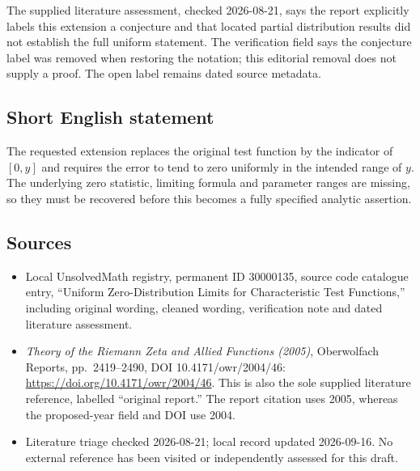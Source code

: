 \documentclass[11pt]{article}
\begin{document}
The supplied literature assessment, checked 2026-08-21, says the report explicitly labels this extension a conjecture and that located partial distribution results did not establish the full uniform statement. The verification field says the conjecture label was removed when restoring the notation; this editorial removal does not supply a proof. The open label remains dated source metadata.
\subsection{Short English statement}
The requested extension replaces the original test function by the indicator of \([0,y]\) and requires the error to tend to zero uniformly in the intended range of \(y\). The underlying zero statistic, limiting formula and parameter ranges are missing, so they must be recovered before this becomes a fully specified analytic assertion.
\subsection{Sources}
\begin{itemize}
\item Local UnsolvedMath registry, permanent ID 30000135, source code catalogue entry, ``Uniform Zero-Distribution Limits for Characteristic Test Functions,'' including original wording, cleaned wording, verification note and dated literature assessment.
\item \emph{Theory of the Riemann Zeta and Allied Functions (2005)}, Oberwolfach Reports, pp.\ 2419--2490, DOI 10.4171/owr/2004/46: \url{https://doi.org/10.4171/owr/2004/46}. This is also the sole supplied literature reference, labelled ``original report.'' The report citation uses 2005, whereas the proposed-year field and DOI use 2004.
\item Literature triage checked 2026-08-21; local record updated 2026-09-16. No external reference has been visited or independently assessed for this draft.
\end{itemize}
\end{document}

